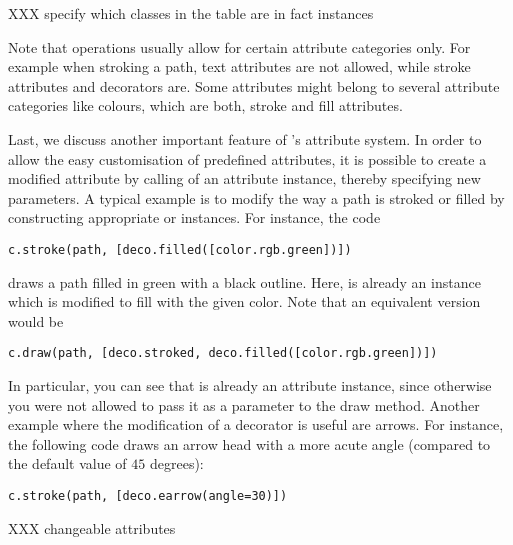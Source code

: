 XXX specify which classes in the table are in fact instances

Note that operations usually allow for certain attribute categories
only. For example when stroking a path, text attributes are not
allowed, while stroke attributes and decorators are. Some attributes
might belong to several attribute categories like colours, which are
both, stroke and fill attributes.

Last, we discuss another important feature of \PyX's attribute system.
In order to allow the easy customisation of predefined attributes, it
is possible to create a modified attribute by calling of an attribute
instance, thereby specifying new parameters. A typical example is to
modify the way a path is stroked or filled by constructing appropriate
 or  instances.
For instance, the code
\begin{verbatim}
c.stroke(path, [deco.filled([color.rgb.green])])
\end{verbatim}
draws a path filled in green with a black outline. Here,
 is already an instance which is modified to fill 
with the given color. Note that an equivalent version would
be
\begin{verbatim}
c.draw(path, [deco.stroked, deco.filled([color.rgb.green])])
\end{verbatim}
In particular, you can see that  is already an
attribute instance, since otherwise you were not allowed to pass
it as a parameter to the draw method. Another example where 
the modification of a decorator is useful are arrows. For instance, the following
code draws an arrow head with a more acute angle (compared to the
default value of $45$ degrees):
\begin{verbatim}
c.stroke(path, [deco.earrow(angle=30)])
\end{verbatim}


XXX changeable attributes
